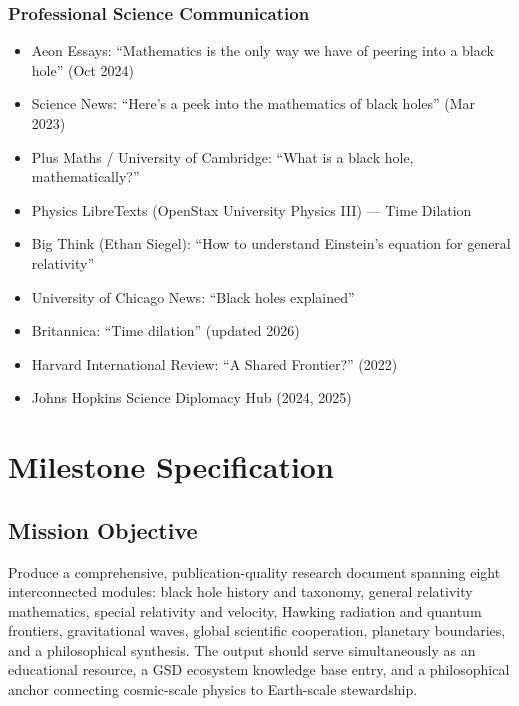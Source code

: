 \documentclass[11pt,letterpaper]{article}
\newcommand{\stageheader}[2]{%
  \noindent\colorbox{#2}{\makebox[\textwidth][l]{%
    \textcolor{white}{\bfseries\sffamily\hspace{6pt}#1\hspace{6pt}}}}%
  \vspace{0.5em}\par%
}
\begin{document}
\subsubsection*{Professional Science Communication}
\begin{itemize}[noitemsep]
\item Aeon Essays: ``Mathematics is the only way we have of peering into a black hole'' (Oct 2024)
\item Science News: ``Here's a peek into the mathematics of black holes'' (Mar 2023)
\item Plus Maths / University of Cambridge: ``What is a black hole, mathematically?''
\item Physics LibreTexts (OpenStax University Physics III) --- Time Dilation
\item Big Think (Ethan Siegel): ``How to understand Einstein's equation for general relativity''
\item University of Chicago News: ``Black holes explained''
\item Britannica: ``Time dilation'' (updated 2026)
\item Harvard International Review: ``A Shared Frontier?'' (2022)
\item Johns Hopkins Science Diplomacy Hub (2024, 2025)
\end{itemize}

\newpage

\stageheader{STAGE 3 --- MISSION PACKAGE}{tertiary}

\section{Milestone Specification}

\subsection{Mission Objective}

Produce a comprehensive, publication-quality research document spanning eight interconnected modules: black hole history and taxonomy, general relativity mathematics, special relativity and velocity, Hawking radiation and quantum frontiers, gravitational waves, global scientific cooperation, planetary boundaries, and a philosophical synthesis. The output should serve simultaneously as an educational resource, a GSD ecosystem knowledge base entry, and a philosophical anchor connecting cosmic-scale physics to Earth-scale stewardship.
\end{document}
